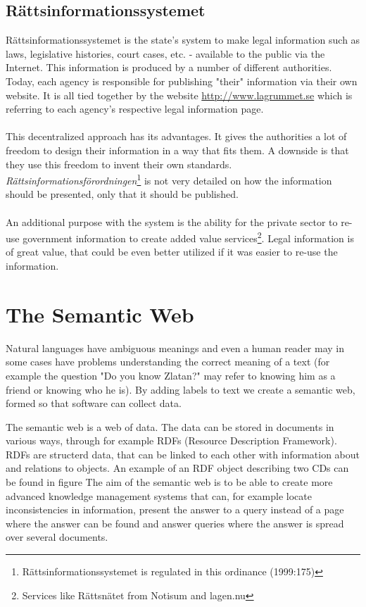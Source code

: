 \documentclass[a4paper,11pt]{kth-mag}
\begin{document}
\subsection{Rättsinformationssystemet}
Rättsinformationssystemet is the state's system to make legal information such as laws, legislative histories, court cases, etc. - available to the public via the Internet. This information is produced by a number of different authorities. Today, each agency is responsible for publishing "their" information via their own website. It is all tied together by the website \url{http://www.lagrummet.se} which is referring to each agency's respective legal information page.\\\\
This decentralized approach has its advantages. It gives the authorities a lot of freedom to design their information in a way that fits them. A downside is that they use this freedom to invent their own standards. \textit{Rättsinformationsförordningen}\footnote{Rättsinformationssystemet is regulated in this ordinance (1999:175)} is not very detailed on how the information should be presented, only that it should be published.\\\\
An additional purpose with the system is the ability for the private sector to re-use government information to create added value services\footnote{Services like Rättsnätet from Notisum and lagen.nu}. Legal information is of great value, that could be even better utilized if it was easier to re-use the information.

\section{The Semantic Web} Natural languages have ambiguous meanings and even
a human reader may in some cases have problems understanding the correct
meaning of a text (for example the question "Do you know Zlatan?" may refer to
knowing him as a friend or knowing who he is). By adding labels to text we
create a semantic web, formed so that software can collect data.

The semantic web is a web of data. The data can be stored in documents in
various ways, through for example RDFs (Resource Description Framework). RDFs
are structerd data, that can be linked to each other with information about
and relations to objects. An example of an RDF object describing two CDs can
be found in figure The aim of the semantic web is to be able to create more
advanced knowledge management systems that can, for example locate
inconsistencies in information, present the answer to a query instead of a
page where the answer can be found and answer queries where the answer is
spread over several documents.
\end{document}

